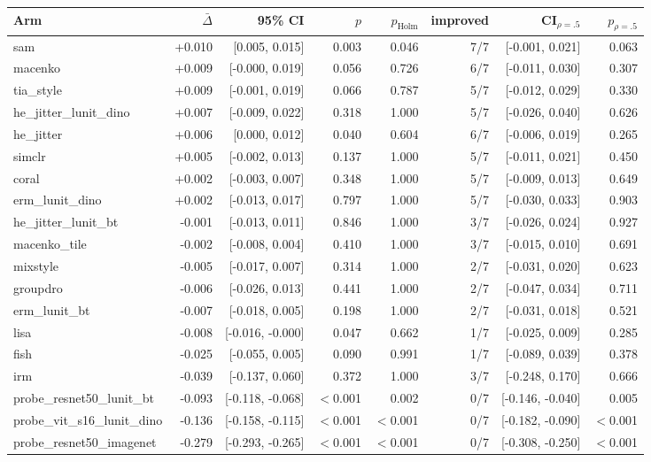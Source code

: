 \begin{tabular}{lrrrrrrr}
\toprule
Arm & $\bar\Delta$ & 95\% CI & $p$ & $p_\text{Holm}$ & improved & CI$_{\rho=.5}$ & $p_{\rho=.5}$ \\
\midrule
sam & +0.010 & [0.005, 0.015] & 0.003 & 0.046 & 7/7 & [-0.001, 0.021] & 0.063 \\
macenko & +0.009 & [-0.000, 0.019] & 0.056 & 0.726 & 6/7 & [-0.011, 0.030] & 0.307 \\
tia\_style & +0.009 & [-0.001, 0.019] & 0.066 & 0.787 & 5/7 & [-0.012, 0.029] & 0.330 \\
he\_jitter\_lunit\_dino & +0.007 & [-0.009, 0.022] & 0.318 & 1.000 & 5/7 & [-0.026, 0.040] & 0.626 \\
he\_jitter & +0.006 & [0.000, 0.012] & 0.040 & 0.604 & 6/7 & [-0.006, 0.019] & 0.265 \\
simclr & +0.005 & [-0.002, 0.013] & 0.137 & 1.000 & 5/7 & [-0.011, 0.021] & 0.450 \\
coral & +0.002 & [-0.003, 0.007] & 0.348 & 1.000 & 5/7 & [-0.009, 0.013] & 0.649 \\
erm\_lunit\_dino & +0.002 & [-0.013, 0.017] & 0.797 & 1.000 & 5/7 & [-0.030, 0.033] & 0.903 \\
he\_jitter\_lunit\_bt & -0.001 & [-0.013, 0.011] & 0.846 & 1.000 & 3/7 & [-0.026, 0.024] & 0.927 \\
macenko\_tile & -0.002 & [-0.008, 0.004] & 0.410 & 1.000 & 3/7 & [-0.015, 0.010] & 0.691 \\
mixstyle & -0.005 & [-0.017, 0.007] & 0.314 & 1.000 & 2/7 & [-0.031, 0.020] & 0.623 \\
groupdro & -0.006 & [-0.026, 0.013] & 0.441 & 1.000 & 2/7 & [-0.047, 0.034] & 0.711 \\
erm\_lunit\_bt & -0.007 & [-0.018, 0.005] & 0.198 & 1.000 & 2/7 & [-0.031, 0.018] & 0.521 \\
lisa & -0.008 & [-0.016, -0.000] & 0.047 & 0.662 & 1/7 & [-0.025, 0.009] & 0.285 \\
fish & -0.025 & [-0.055, 0.005] & 0.090 & 0.991 & 1/7 & [-0.089, 0.039] & 0.378 \\
irm & -0.039 & [-0.137, 0.060] & 0.372 & 1.000 & 3/7 & [-0.248, 0.170] & 0.666 \\
probe\_resnet50\_lunit\_bt & -0.093 & [-0.118, -0.068] & $<$0.001 & 0.002 & 0/7 & [-0.146, -0.040] & 0.005 \\
probe\_vit\_s16\_lunit\_dino & -0.136 & [-0.158, -0.115] & $<$0.001 & $<$0.001 & 0/7 & [-0.182, -0.090] & $<$0.001 \\
probe\_resnet50\_imagenet & -0.279 & [-0.293, -0.265] & $<$0.001 & $<$0.001 & 0/7 & [-0.308, -0.250] & $<$0.001 \\
\bottomrule
\end{tabular}
